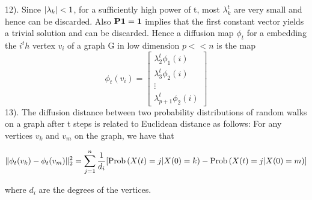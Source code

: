 12). Since $\lvert\lambda_{k}\rvert < 1$, for a sufficiently high power of t,
most $\lambda_{k}^{t}$ are very small and hence can be discarded.
Also $\textbf{P}\boldsymbol{1} = \boldsymbol{1}$ implies that the first constant vector
yields a trivial solution and can be discarded.
Hence a diffusion map $\phi_{t}$ for a embedding the $i^th$ vertex $v_{i}$ of a graph  G in  low dimension
$p << n$ is the map $$\phi_{t}(v_{i}) = \begin{bmatrix}
         \lambda_{2}^{t}\phi_{1}(i)\\
         \lambda_{3}^{t}\phi_{2}(i)\\
         \vdots\\
         \lambda_{p+1}^{t}\phi_{2}(i)
        \end{bmatrix} $$
13). The diffusion distance between two probability distributions of random
walks on a graph after t steps is related to Euclidean distance as follows:
For any vertices $v_{k}$ and $v_{m}$ on the graph, we have that

\begin{equation}\label{diffusionDistance}
\lVert\phi_{t}(v_k) - \phi_{t}(v_m)\rVert_{2}^{2} = 
\displaystyle \sum_{j=1}^{n} \frac{1}{d_{i}} 
[ \text{Prob}\left( X(t) = j | X(0) = k \right) -  \text{Prob}\left( X(t) = j | X(0) = m \right) ]
\end{equation}

where $d_{i}$ are the degrees of the vertices.





\newpage

